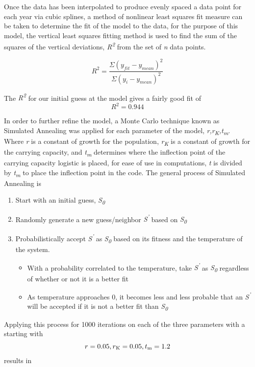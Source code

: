 \documentclass[12pt]{article}
\begin{document}
Once the data has been interpolated to produce evenly spaced a data point for each year via cubic splines, a method of nonlinear least squares fit measure can be taken to determine the fit of the model to the data, for the purpose of this model, the vertical least squares fitting method is used to find the sum of the squares of the vertical deviations, \textit{R\textsuperscript{2}} from the set of \textit{n} data points.


\begin{equation} R^2 = \frac{\Sigma(y_{fit} - y_{mean})^2} {\Sigma(y_{i} - y_{mean})^2}  \end{equation}


The \textit{R\textsuperscript{2}} for our initial guess at the model gives a fairly good fit of
\begin{equation} R^2 = 0.944 \end{equation}


In order to further refine the model, a Monte Carlo technique known as Simulated Annealing was applied for each parameter of the model,
\textit{r,r\textsubscript{K},t\textsubscript{m}}. Where \textit{r} is a constant of growth for the population, \textit{r\textsubscript{K}} is a constant of growth for the carrying capacity, and \textit{t\textsubscript{m}} determines where the inflection point of the carrying capacity logistic is placed, for ease of use in computations, \textit{t} is divided by \textit{t\textsubscript{m}} to place the inflection point in the code. The general process of Simulated Annealing is
\begin{enumerate}


\item{Start with an initial guess, \textit{S\textsubscript{0}}}
\item{Randomly generate a new guess/neighbor \textit{S\textsuperscript{'}}} based on \textit{S\textsubscript{0}}
\item{Probabilistically accept \textit{S\textsuperscript{'}} as \textit{S\textsubscript{0}} based on its fitness and the temperature of the system.}
\begin{itemize}
	\item{With a probability correlated to the temperature, take \textit{S\textsuperscript{'}} as \textit{S\textsubscript{0}} regardless of whether or not it is a better fit}
	\item{As temperature approaches 0, it becomes less and less probable that an \textit{S\textsuperscript{'}} will be accepted if it is not a better fit than \textit{S\textsubscript{0}}}
\end{itemize}
\end{enumerate}
Applying this process for 1000 iterations on each of the three parameters with a starting with 
\begin{equation} 
r=0.05,r\textsubscript{K}=0.05,t\textsubscript{m}=1.2
\end{equation}
results in
\end{document}
